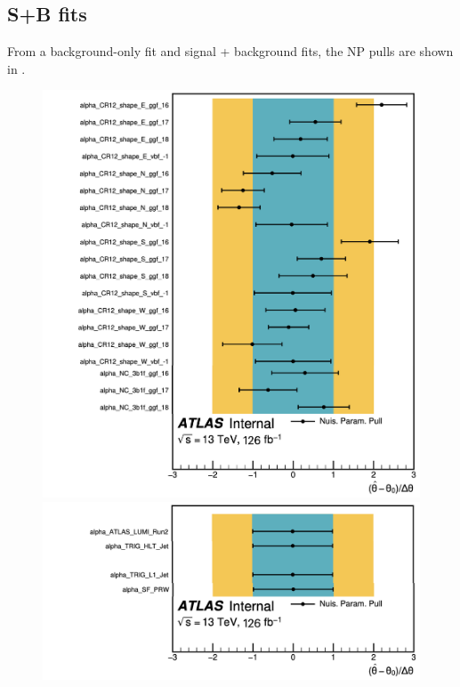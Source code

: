 \subsection{S+B fits}

From a background-only fit and signal + background fits, the NP pulls are shown in \Fig{\ref{fig:ggf_vbf-pulls-corr-bonly}}.

\noindent
\begin{figure}
\begin{minipage}{0.48\textwidth}
\centering
{}
\includegraphics[width=.9\textwidth]{figures/my_dihiggs/BKG-bkg-only-pulls} 
\\
\vspace{.75em}
\includegraphics[width=.85\textwidth]{figures/my_dihiggs/DATA-bkg-only-pulls}

\end{minipage}
\end{figure}
